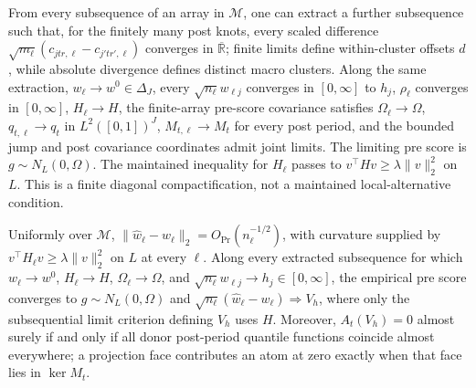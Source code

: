 From every subsequence of an array in \(\mathcal M\), one can extract a further subsequence such that, for the finitely many post knots, every scaled difference \(\sqrt{m_\ell}(c_{jtr,\ell}-c_{j'tr',\ell})\) converges in \(\overline{\mathbb R}\); finite limits define within-cluster offsets \(d\), while absolute divergence defines distinct macro clusters.  Along the same extraction, \(w_\ell\to w^0\in\Delta_J\), every \(\sqrt{n_\ell}w_{\ell j}\) converges in \([0,\infty]\) to \(h_j\), \(\rho_\ell\) converges in \([0,\infty]\), \(H_\ell\to H\), the finite-array pre-score covariance satisfies \(\Omega_\ell\to\Omega\), \(q_{t,\ell}\to q_t\) in \(L^2([0,1])^J\), \(M_{t,\ell}\to M_t\) for every post period, and the bounded jump and post covariance coordinates admit joint limits.  The limiting pre score is \(g\sim N_L(0,\Omega)\).  The maintained inequality for \(H_\ell\) passes to \(v^\top Hv\geq\lambda\|v\|_2^2\) on \(L\).  This is a finite diagonal compactification, not a maintained local-alternative condition.

Uniformly over \(\mathcal M\), \(\|\widehat w_\ell-w_\ell\|_2=O_{\Pr}(n_\ell^{-1/2})\), with curvature supplied by \(v^\top H_\ell v\geq\lambda\|v\|_2^2\) on \(L\) at every \(\ell\).  Along every extracted subsequence for which \(w_\ell\to w^0\), \(H_\ell\to H\), \(\Omega_\ell\to\Omega\), and \(\sqrt{n_\ell}w_{\ell j}\to h_j\in[0,\infty]\), the empirical pre score converges to \(g\sim N_L(0,\Omega)\) and \(\sqrt{n_\ell}(\widehat w_\ell-w_\ell)\Rightarrow V_h\), where only the subsequential limit criterion defining \(V_h\) uses \(H\).  Moreover, \(A_t(V_h)=0\) almost surely if and only if all donor post-period quantile functions coincide almost everywhere; a projection face contributes an atom at zero exactly when that face lies in \(\ker M_t\).

